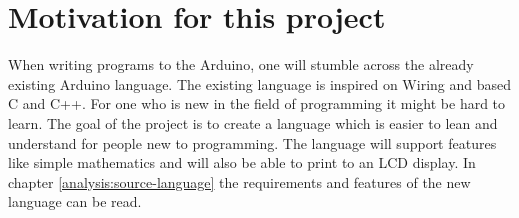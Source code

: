 \section{Motivation for this project}\label{introduction:motivation}
When writing programs to the Arduino, one will stumble across the already existing Arduino language. The existing language is inspired on Wiring and based C and C++. For one who is new in the field of programming it might be hard to learn. %
The goal of the project is to create a language which is easier to lean and understand for people new to programming.
  The language will support features like simple mathematics and will also be able to print to an LCD display. In chapter \ref{analysis:source-language} the requirements and features of the new language can be read.

